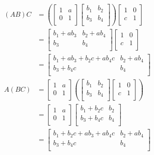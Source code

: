 \documentclass[a4paper]{article}
\begin{document}
\begin{align*}
	\!\left( AB \right) C & =
	\!\left( 
	\begin{bmatrix}
		1 & a \\
		0 & 1 \\
	\end{bmatrix}
	\begin{bmatrix}
		b_{1} & b_{2} \\
		b_{3} & b_{4} \\
	\end{bmatrix}
	\right) 
	\begin{bmatrix}
		1 & 0 \\
		c & 1 \\
	\end{bmatrix} \\
	& =
	\begin{bmatrix}
		b_{1} + a b_{3} & b_{2} + ab_{4} \\
		b_{3} & b_{4} \\
	\end{bmatrix}
	\begin{bmatrix}
		1 & 0 \\
		c & 1 \\
	\end{bmatrix} \\
	& =
	\begin{bmatrix}
		b_{1} + ab_{3} + b_{2}c + ab_{4}c & b_{2} + ab_{4} \\
		b_{3} + b_{4}c & b_{4} \\
	\end{bmatrix} \\
	A \!\left( BC \right) & =
	\begin{bmatrix}
		1 & a \\
		0 & 1 \\
	\end{bmatrix}
	\!\left( 
	\begin{bmatrix}
		b_{1} & b_{2} \\
		b_{3} & b_{4} \\
	\end{bmatrix}
	\begin{bmatrix}
		1 & 0 \\
		c & 1 \\
	\end{bmatrix}
	\right) \\
	& = 
	\begin{bmatrix}
		1 & a \\
		0 & 1 \\
	\end{bmatrix}
	\begin{bmatrix}
		b_{1} + b_{2}c & b_{2} \\
		b_{3} + b_{4}c & b_{4} \\
	\end{bmatrix} \\
	& =
	\begin{bmatrix}
		b_{1} + b_{2}c + ab_{3} + ab_{4}c & b_{2} + ab_{4} \\
		b_{3} + b_{4}c & b_{4} \\
	\end{bmatrix}
\end{align*}
\end{document}
